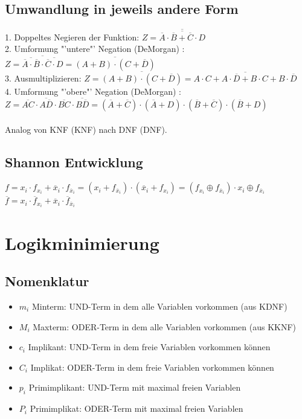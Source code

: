 \documentclass[6pt,a4paper]{scrartcl}
\newcommand{\ol}[1]{\ensuremath{\overline{#1}}}									%
\begin{document}
\begin{multicols*}{3}
	\subsection{Umwandlung in jeweils andere Form}
	1. Doppeltes Negieren der Funktion: $ Z = \overline {\overline{\overline A \cdot \overline B + \overline C \cdot D}}$\\
	2. Umformung "'untere"'  Negation (DeMorgan) : $ Z = \ol{\ol{\ol A \cdot \ol B} \cdot \ol{\ol C \cdot D}} = \ol{(A+B) \cdot (C+\ol D)}$\\
	3. Ausmultiplizieren: $ Z = \ol{(A+B) \cdot (C+\ol D)} = \ol{A\cdot C + A\cdot \ol D + B \cdot C + B \cdot \ol D}$\\
	4. Umformung "'obere"'  Negation (DeMorgan) :\\ $ Z= \ol{AC} \cdot \ol{A \ol D} \cdot \ol{BC} \cdot \ol{B\ol D} = ( \ol A + \ol C) \cdot ( \ol A + D) \cdot ( \ol B + \ol C) \cdot ( \ol B + D)$\\ \\
	Analog von KNF (KNF) nach DNF (DNF).

	\subsection{Shannon Entwicklung}
		$f = x_i \cdot f_{x_i} + \ol x_i \cdot f_{\ol x_i} = (x_i + f_{\ol x_i})\cdot ( \ol x_i + f_{x_i}) = (f_{x_i} \oplus f_{\ol x_i}) \cdot x_i \oplus f_{\ol x_i}$ \\
		$\ol f = x_i \cdot \ol f_{x_i} + \ol x_i \cdot \ol f_{\ol x_i}$

\section{Logikminimierung}
	\subsection{Nomenklatur}
	\begin{itemize}\itemsep0pt
	\item $m_i$ Minterm: UND-Term in dem alle Variablen vorkommen (aus KDNF)
	\item $M_i$ Maxterm: ODER-Term in dem alle Variablen vorkommen (aus KKNF)
	\item $c_i$ Implikant: UND-Term in dem freie Variablen vorkommen können
	\item $C_i$ Implikat: ODER-Term in dem freie Variablen vorkommen können
	\item $p_i$ Primimplikant: UND-Term mit maximal freien Variablen
	\item $P_i$ Primimplikat: ODER-Term mit maximal freien Variablen
	\end{itemize}


\end{multicols*}
\end{document}
